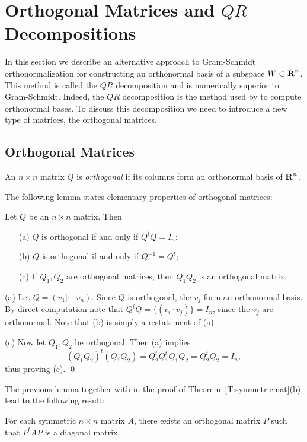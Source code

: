 \section{Orthogonal Matrices and $QR$ Decompositions}
\label{S:QR}

In this section we describe an alternative approach to Gram-Schmidt
orthonormalization for constructing an orthonormal basis of a subspace
$W\subset\mbox{$\bf{R}$}^n$.  This method is called the $QR$ decomposition and is
numerically
superior to Gram-Schmidt.  Indeed, the $QR$ decomposition is the method used by
\Matlab to compute orthonormal bases.  To discuss this decomposition we need
to introduce a new type of matrices, the orthogonal matrices.

\subsection*{Orthogonal Matrices}

\begin{Def} \label{def:orthmat}
An $n\times n$ matrix $Q$ is {\em orthogonal\/} if its columns form an
orthonormal basis
of $\mbox{$\bf{R}$}^n$.
\end{Def}

The following lemma states elementary properties of orthogonal matrices:
\begin{lemma} \label{lem:orthprop}
Let $Q$ be an $n\times n$ matrix.  Then
\begin{itemize}
\item[(a)] $Q$ is orthogonal if and only if $Q^tQ=I_n$;
\item[(b)] $Q$ is orthogonal if and only if $Q^{-1} = Q^t$;
\item[(c)] If $Q_1,Q_2$ are orthogonal matrices, then $Q_1Q_2$ is
an orthogonal matrix.
\end{itemize}
\end{lemma}
\proof  (a) Let $Q=(v_1|\cdots|v_n)$.  Since $Q$ is orthogonal, the $v_j$
form an orthonormal basis.  By direct computation note that
$Q^tQ=\{(v_i\cdot v_j)\}=I_n$, since the $v_j$ are orthonormal. Note that
(b) is simply a restatement of (a).

\noindent (c) Now let $Q_1,Q_2$ be orthogonal. Then (a) implies
\[
(Q_1Q_2)^t(Q_1Q_2) = Q_2^tQ_1^tQ_1Q_2 = Q_2^tQ_2 = I_n,
\]
thus proving (c).  \qed

The previous lemma together with  in the proof of
Theorem~\ref{T:symmetricmat}(b) lead to the following result:
\begin{prop}  For each symmetric $n\times n$ matrix $A$, there exists an
orthogonal matrix $P$ such that $P^tAP$ is a diagonal matrix.
\end{prop}

